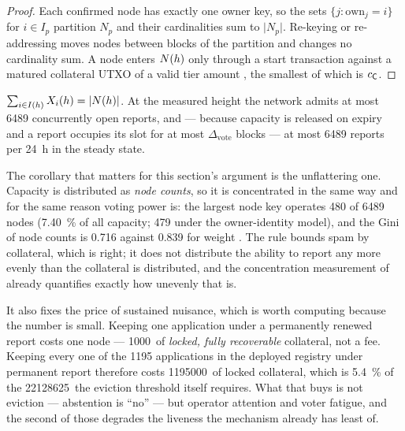 \begin{proof}
Each confirmed node has exactly one owner key, so the sets $\{j : \mathrm{own}_j = i\}$ for
$i \in I_p$ partition $N_p$ and their cardinalities sum to $\lvert N_p \rvert$. Re-keying or
re-addressing moves nodes between blocks of the partition and changes no cardinality sum. A node
enters $N(h)$ only through a start transaction against a matured collateral UTXO of a valid tier
amount , the smallest of which is $c_{\mathsf{C}}$.
\end{proof}

\begin{corollary}
\label{cor:23:capacity}
$\sum_{i \in I(h)} X_i(h) = \lvert N(h) \rvert$. At the measured height the network admits
at most \num{6489} concurrently open reports, and --- because capacity is released on expiry and a
report occupies its slot for at most $\Delta_{\mathrm{vote}}$ blocks --- at most \num{6489} reports
per \SI{24}{\hour} in the steady state.
\end{corollary}

The corollary that matters for this section's argument is the unflattering one. Capacity is
distributed as \emph{node counts}, so it is concentrated in the same way and for the same reason
voting power is: the largest node key operates \num{480} of \num{6489} nodes
(\SI{7.40}{\percent} of all capacity; \num{479} under the owner-identity model), and the Gini of node counts is \num{0.716} against
\num{0.839} for weight . The rule
bounds spam by collateral, which is right; it does not distribute the ability to report any more
evenly than the collateral is distributed, and the concentration measurement of
 already quantifies exactly how unevenly that is.

It also fixes the price of sustained nuisance, which is worth computing because the number is small.
Keeping one application under a permanently renewed report costs one node --- \num{1000}\flux\ of
\emph{locked, fully recoverable} collateral, not a fee. Keeping every one of the \num{1195}
applications in the deployed registry
 under permanent report
therefore costs \num{1195000}\flux\ of locked collateral, which is \SI{5.4}{\percent} of the
\num{22128625}\flux\ the eviction threshold itself requires. What that buys is not eviction ---
abstention is ``no'' --- but operator attention and voter fatigue, and the second of those degrades
the liveness the mechanism already has least of.

